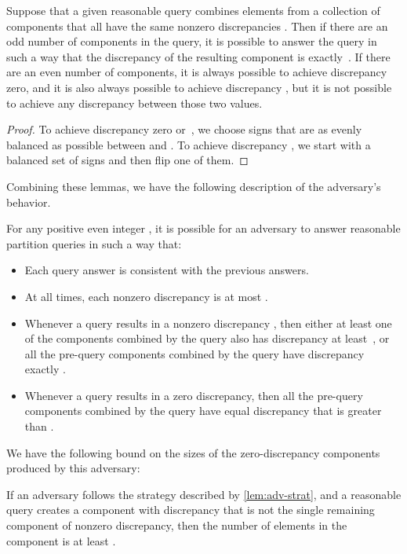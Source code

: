 \documentclass[11pt]{llncs}
\begin{document}
\begin{lemma}
Suppose that a given reasonable query combines elements from a collection of components  that all have the same nonzero discrepancies . Then if there are an odd number of components in the query, it is possible to answer the query in such a way that the discrepancy of the resulting component is exactly~. If there are an even number of components, it is always possible to achieve discrepancy zero, and it is also always possible to achieve discrepancy , but it is not possible to achieve any discrepancy between those two values.
\end{lemma}

\begin{proof}
To achieve discrepancy zero or~, we choose signs  that are as evenly balanced as possible between  and . To achieve discrepancy , we start with a balanced set of signs and then flip one of them.
\end{proof}

Combining these lemmas, we have the following description of the adversary's behavior.

\begin{lemma}
\label{lem:adv-strat}
For any positive even integer , it is possible for an adversary to answer reasonable partition queries in such a way that:
\begin{itemize}
\item Each query answer is consistent with the previous answers.
\item At all times, each nonzero discrepancy is at most .
\item Whenever a query results in a nonzero discrepancy , then either at least one of the components combined by the query also has discrepancy at least~, or all the pre-query components combined by the query have discrepancy exactly .
\item Whenever a query results in a zero discrepancy, then all the pre-query components combined by the query have equal discrepancy that is greater than .
\end{itemize}
\end{lemma}

We have the following bound on the sizes of the zero-discrepancy components produced by this adversary:

\begin{lemma}
If an adversary follows the strategy described by \autoref{lem:adv-strat}, and a reasonable query creates a component with discrepancy  that is not the single remaining component of nonzero discrepancy, then the number of elements in the component is at least .
\end{lemma}
\end{document}
